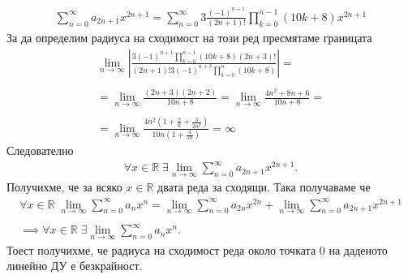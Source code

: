 \documentclass[a4paper,14pt]{extarticle}
\newcommand{\R}{\mathbb{R}}
\begin{document}
\begin{align*}
    \displaystyle\sum_{n = 0}^\infty a_{2n + 1} x^{2n + 1} = \displaystyle\sum_{n = 0}^\infty 3\frac{(-1)^{n + 1}}{(2n + 1)!}\displaystyle\prod_{k = 0}^{n - 1}(10k + 8) x^{2n + 1}
\end{align*}
За да определим радиуса на сходимост на този ред пресмятаме границата
\begin{align*}
    \displaystyle\lim_{n \to \infty} \left|\displaystyle\frac{3(-1)^{n + 1}\displaystyle\prod_{k = 0}^{n - 1}(10k + 8)(2n + 3)!}{(2n + 1)!3(-1)^{n + 3}\displaystyle\prod_{k = 0}^{n}(10k + 8)}\right| = \\\\
    = \displaystyle\lim_{n \to \infty} \displaystyle\frac{(2n + 3)(2n + 2)}{10n + 8} = \displaystyle\lim_{n \to \infty} \displaystyle\frac{4n^2 + 8n + 6}{10n + 8} = \\\\
    = \displaystyle\lim_{n \to \infty} \displaystyle\frac{4n^2\left(1 + \frac{2}{n} + \frac{3}{2n^2}\right)}{10n\left(1 + \frac{4}{5n}\right)} = \infty
\end{align*}
Следователно
\begin{align*}
    \forall x \in \R \; \exists \displaystyle\lim_{n \to \infty}\displaystyle\sum_{n = 0}^\infty a_{2n + 1} x^{2n + 1}.
\end{align*}
Получихме, че за всяко $x \in \R$ двата реда за сходящи. Така получаваме че
\begin{align*}
    \forall x \in \R \; \displaystyle\lim_{n \to \infty}\displaystyle\sum_{n = 0}^\infty a_n x^n =
    \displaystyle\lim_{n \to \infty}\displaystyle\sum_{n = 0}^\infty a_{2n} x^{2n}
    + \displaystyle\lim_{n \to \infty}\displaystyle\sum_{n = 0}^\infty a_{2n + 1} x^{2n + 1} \\\\
    \implies \forall x \in \R \; \exists \displaystyle\lim_{n \to \infty}\displaystyle\sum_{n = 0}^\infty a_n x^n.
\end{align*}
Тоест получихме, че радиуса на сходимост реда около точката $0$ на даденото линейно ДУ е безкрайност.
\end{document}
